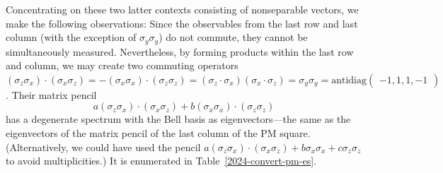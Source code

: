 \documentclass[
  twocolumn,
 showpacs,
 showkeys,
 preprintnumbers,
 amsmath,amssymb,
 aps,
 pra,
  longbibliography,
 floatfix,
 ]{revtex4-2}
\newcommand\myotimes{ }
\begin{document}
Concentrating on these two latter contexts consisting of nonseparable vectors, we make the following observations:
Since the observables from the last row and last column (with the exception of  $\sigma_y \myotimes \sigma_y$) do not commute, they cannot be simultaneously measured.
Nevertheless, by forming products within the last row and column, we may create two commuting operators
%
%
$
(\sigma_z \myotimes \sigma_x) \cdot (\sigma_x \myotimes \sigma_z) = -(\sigma_x \myotimes \sigma_x) \cdot (\sigma_z \myotimes \sigma_z)
=
(\sigma_z \cdot \sigma_x ) \myotimes (\sigma_x \cdot \sigma_z)
=   \sigma_y  \myotimes \sigma_y
= \text{antidiag}
\begin{pmatrix} -1 , 1 ,1, -1
\end{pmatrix}
$.
Their matrix pencil
\begin{equation}
a(\sigma_z \myotimes \sigma_x) \cdot (\sigma_x \myotimes \sigma_z) + b (\sigma_x \myotimes \sigma_x) \cdot (\sigma_z \myotimes \sigma_z)
\label{2024-convert-mppm}
\end{equation}
has a degenerate spectrum with the Bell basis as eigenvectors---the
same as the eigenvectors of the matrix pencil of the last column of the PM square.
(Alternatively, we could have used
the pencil
\(
a(\sigma_z \myotimes \sigma_x) \cdot (\sigma_x \myotimes \sigma_z) + b \sigma_x \myotimes \sigma_x + c \sigma_z \myotimes \sigma_z
\) to avoid multiplicities.)
It is enumerated in Table~\ref{2024-convert-pm-es}.
\end{document}
